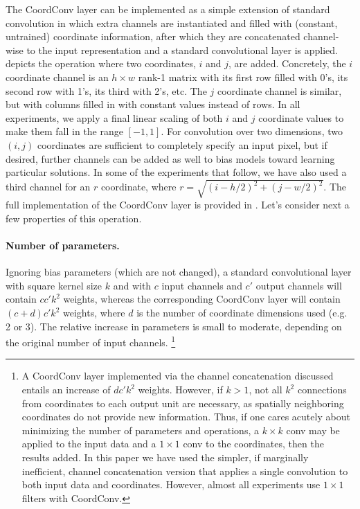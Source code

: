 \documentclass{article}
\begin{document}
The CoordConv layer can be implemented as a simple extension of standard convolution in which extra channels are instantiated and filled with (constant, untrained) coordinate information, after which they are  concatenated channel-wise to the input representation and a standard convolutional layer is applied.
 depicts the operation where two coordinates, $i$ and $j$, are added.
Concretely, the $i$ coordinate channel is an $h\times w$ rank-1 matrix with its first row filled with 0's, its second row with 1's, its third with 2's, etc. The $j$ coordinate channel is similar, but with columns filled in with constant values instead of rows. In all experiments, we apply a final linear scaling of both $i$ and $j$ coordinate values to make them fall in the range $[-1,1]$.
For convolution over two dimensions, two $(i,j)$ coordinates are sufficient to completely specify an input pixel, but if desired, further channels can be added as well to bias models toward learning particular solutions.
In some of the experiments that follow, we have also used a third channel for an $r$ coordinate, where $r = \sqrt{(i-h/2)^2+(j-w/2)^2}$. The full implementation of the CoordConv layer is provided in .
Let's consider next a few properties of this operation.

\paragraph{Number of parameters.} \vspace*{-.6em}
Ignoring bias parameters (which are not changed), a standard convolutional layer with square kernel size $k$ and with $c$ input channels and $c'$ output channels will contain $cc'k^2$ weights, whereas the corresponding CoordConv layer will contain $(c+d)c'k^2$ weights, where $d$ is the number of coordinate dimensions used (e.g. 2 or 3). The relative increase in parameters is small to moderate, depending on the original number of input channels.
\footnote{A CoordConv layer implemented via the channel concatenation discussed entails an increase of $dc'k^2$ weights. However, if $k>1$, not all $k^2$ connections from coordinates to each output unit are necessary, as spatially neighboring coordinates do not provide new information. Thus, if one cares acutely about minimizing the number of parameters and operations, a $k\times k$ conv may be applied to the input data and a $1\times1$ conv to the coordinates, then the results added. In this paper we have used the simpler, if marginally inefficient, channel concatenation version that applies a single convolution to both input data and coordinates. However, almost all experiments use $1\times1$ filters with CoordConv.}
\end{document}
